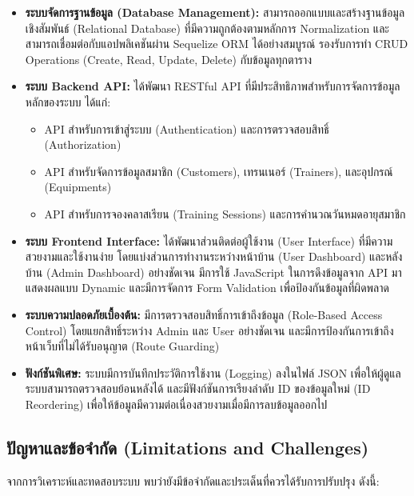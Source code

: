 \begin{itemize}
    \item \textbf{ระบบจัดการฐานข้อมูล (Database Management):} สามารถออกแบบและสร้างฐานข้อมูลเชิงสัมพันธ์ (Relational Database) ที่มีความถูกต้องตามหลักการ Normalization และสามารถเชื่อมต่อกับแอปพลิเคชันผ่าน Sequelize ORM ได้อย่างสมบูรณ์ รองรับการทำ CRUD Operations (Create, Read, Update, Delete) กับข้อมูลทุกตาราง
    
    \item \textbf{ระบบ Backend API:} ได้พัฒนา RESTful API ที่มีประสิทธิภาพสำหรับการจัดการข้อมูลหลักของระบบ ได้แก่:
    \begin{itemize}
        \item API สำหรับการเข้าสู่ระบบ (Authentication) และการตรวจสอบสิทธิ์ (Authorization)
        \item API สำหรับจัดการข้อมูลสมาชิก (Customers), เทรนเนอร์ (Trainers), และอุปกรณ์ (Equipments)
        \item API สำหรับการจองคลาสเรียน (Training Sessions) และการคำนวณวันหมดอายุสมาชิก
    \end{itemize}

    \item \textbf{ระบบ Frontend Interface:} ได้พัฒนาส่วนติดต่อผู้ใช้งาน (User Interface) ที่มีความสวยงามและใช้งานง่าย โดยแบ่งส่วนการทำงานระหว่างหน้าบ้าน (User Dashboard) และหลังบ้าน (Admin Dashboard) อย่างชัดเจน มีการใช้ JavaScript ในการดึงข้อมูลจาก API มาแสดงผลแบบ Dynamic และมีการจัดการ Form Validation เพื่อป้องกันข้อมูลที่ผิดพลาด

    \item \textbf{ระบบความปลอดภัยเบื้องต้น:} มีการตรวจสอบสิทธิ์การเข้าถึงข้อมูล (Role-Based Access Control) โดยแยกสิทธิ์ระหว่าง Admin และ User อย่างชัดเจน และมีการป้องกันการเข้าถึงหน้าเว็บที่ไม่ได้รับอนุญาต (Route Guarding)
    
    \item \textbf{ฟังก์ชันพิเศษ:} ระบบมีการบันทึกประวัติการใช้งาน \newline (Logging) ลงในไฟล์ JSON เพื่อให้ผู้ดูแลระบบสามารถตรวจสอบย้อนหลังได้ และมีฟังก์ชันการเรียงลำดับ ID ของข้อมูลใหม่ \newline (ID Reordering) เพื่อให้ข้อมูลมีความต่อเนื่องสวยงามเมื่อมีการลบข้อมูลออกไป
\end{itemize}

\subsection{ปัญหาและข้อจำกัด (Limitations and Challenges)}
จากการวิเคราะห์และทดสอบระบบ พบว่ายังมีข้อจำกัดและประเด็นที่ควรได้รับการปรับปรุง ดังนี้:

